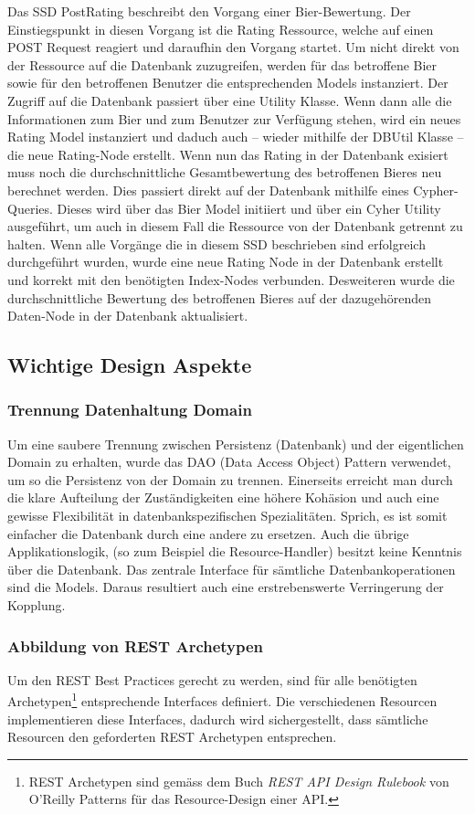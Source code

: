 \documentclass[10pt,a4paper]{scrartcl}
\begin{document}
Das SSD PostRating beschreibt den Vorgang einer Bier-Bewertung. Der Einstiegspunkt in diesen
Vorgang ist die Rating Ressource, welche auf einen POST Request reagiert und daraufhin den Vorgang
startet. Um nicht direkt von der Ressource auf die Datenbank zuzugreifen, werden für das betroffene
Bier sowie für den betroffenen Benutzer die entsprechenden Models instanziert. Der Zugriff auf die
Datenbank passiert über eine Utility Klasse.
Wenn dann alle die Informationen zum Bier und zum Benutzer zur Verfügung stehen, wird ein neues
Rating Model instanziert und daduch auch -- wieder mithilfe der DBUtil Klasse -- die neue
Rating-Node erstellt. Wenn nun das Rating in der Datenbank exisiert muss noch die durchschnittliche
Gesamtbewertung des betroffenen Bieres neu berechnet werden. Dies passiert direkt auf der Datenbank
mithilfe eines Cypher-Queries. Dieses wird über das Bier Model initiiert und über ein Cyher Utility
ausgeführt, um auch in diesem Fall die Ressource von der Datenbank getrennt zu halten.
Wenn alle Vorgänge die in diesem SSD beschrieben sind erfolgreich durchgeführt wurden, wurde eine
neue Rating Node in der Datenbank erstellt und korrekt mit den benötigten Index-Nodes verbunden.
Desweiteren wurde die durchschnittliche Bewertung des betroffenen Bieres auf der dazugehörenden
Daten-Node in der Datenbank aktualisiert.

\subsection{Wichtige Design Aspekte}
\subsubsection*{Trennung Datenhaltung Domain}
Um eine saubere Trennung zwischen Persistenz (Datenbank) und der eigentlichen Domain zu erhalten,
wurde das DAO (Data Access Object) Pattern verwendet, um so die Persistenz von der Domain zu
trennen. Einerseits erreicht man durch die klare Aufteilung der Zuständigkeiten eine höhere
Kohäsion und auch eine gewisse Flexibilität in datenbankspezifischen Spezialitäten. Sprich, es ist
somit einfacher die Datenbank durch eine andere zu ersetzen. Auch die übrige Applikationslogik,
(so zum Beispiel die Resource-Handler) besitzt keine Kenntnis über die Datenbank. Das zentrale
Interface für sämtliche Datenbankoperationen sind die Models. Daraus resultiert auch eine
erstrebenswerte Verringerung der Kopplung.

\subsubsection*{Abbildung von REST Archetypen }
Um den REST Best Practices gerecht zu werden, sind für alle benötigten
Archetypen\footnote{REST Archetypen sind gemäss dem Buch \textit{REST API Design Rulebook} von
O'Reilly Patterns für das Resource-Design einer API.} entsprechende Interfaces definiert. Die
verschiedenen Resourcen implementieren diese Interfaces, dadurch wird sichergestellt, dass
sämtliche Resourcen den geforderten REST Archetypen entsprechen.
\end{document}
